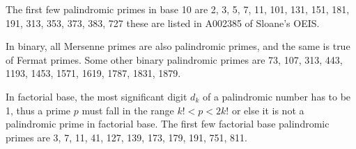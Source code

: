 \documentclass[12pt]{article}
\begin{document}
The first few palindromic primes in base 10 are 2, 3, 5, 7, 11, 101, 131, 151, 181, 191, 313, 353, 373, 383, 727 these are listed in A002385 of Sloane's OEIS.

In binary, all Mersenne primes are also palindromic primes, and the same is true of Fermat primes. Some other binary palindromic primes are 73, 107, 313, 443, 1193, 1453, 1571, 1619, 1787, 1831, 1879.

In factorial base, the most significant digit $d_k$ of a palindromic number has to be 1, thus a prime $p$ must fall in the range $k! < p < 2k!$ or else it is not a palindromic prime in factorial base. The first few factorial base palindromic primes are 3, 7, 11, 41, 127, 139, 173, 179, 191, 751, 811.
\end{document}
